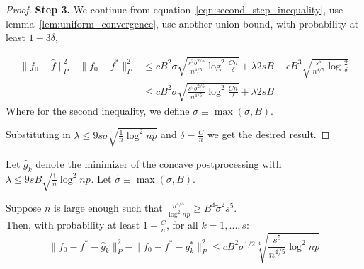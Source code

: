 \begin{proof}

\textbf{Step 3.} We continue from equation~\ref{eqn:second_step_inequality}, use lemma~\ref{lem:uniform_convergence}, use another union bound, with probability at least $1-3\delta$,

\begin{align}
\|f_0 - \hat{f} \|_P^2 - \| f_0 - f^* \|_P^2 
   &\leq cB^2 \sigma 
    \sqrt{ \frac{s^3 b^{2/5}}{n^{4/5}} \log^2 \frac{Cn}{\delta}}
 +\lambda 2 s B + c B^3 \sqrt{ \frac{s^5}{n^{4/5}} \log \frac{2}{\delta}}
    \nonumber \\
&\leq c B^2 \tilde{\sigma} \sqrt{ \frac{s^5 b^{2/5}}{n^{4/5}} \log^2 \frac{Cn}{\delta}} + \lambda 2 sB \nonumber
\end{align}
Where for the second inequality, we define $\tilde{\sigma} \equiv \max(\sigma, B)$.

Substituting in $\lambda \leq 9 s \tilde{\sigma} \sqrt{\frac{1}{n} \log^2 np}$ and $\delta = \frac{C}{n}$ we get the desired result.

\end{proof}
 






\begin{theorem}
\label{thm:concave_consistent}
Let $\hat{g}_k$ denote the minimizer of the concave postprocessing with $\lambda \leq 9 sB \sqrt{\frac{1}{n} \log^2 np}$. Let $\tilde{\sigma} \equiv \max(\sigma, B)$.

Suppose $n$ is large enough such that $\frac{n^{4/5}}{\log^2 np} \geq B^4 \tilde{\sigma}^2 s^5$.\\

Then, with probability at least $1- \frac{C}{n}$, for all $k=1,...,s$:\\
\[
\| f_0 - f^* - \hat{g}_k \|_P^2 - \| f_0 - f^* - g^*_k \|_P^2 \leq  c B^2 \sigma^{1/2} \sqrt[4]{ \frac{s^5}{n^{4/5}} \log^2 np} 
\]
\end{theorem}

